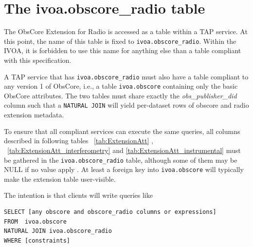 \documentclass[11pt,a4paper]{ivoa}
\begin{document}
\section{The ivoa.obscore\_radio table}
\label{sec:implementation}
The ObsCore Extension for Radio is accessed as a table within a TAP
\citep{2019ivoa.spec.0927D} service.  At this
point, the name of this table is fixed to \verb|ivoa.obscore_radio|.
Within the IVOA, it is forbidden to use this name for anything else than a table compliant
with this specification.


A TAP service that has \verb|ivoa.obscore_radio| must also have a table
compliant to any version 1 of ObsCore, i.e., a table
\verb|ivoa.obscore| containing only the basic ObsCore attributes. The two tables must share exactly the \emph{obs\_publisher\_did} column such
that a \verb|NATURAL JOIN| will yield per-dataset rows of obscore and
radio extension metadata.  

To ensure that all compliant services can execute the same queries,
all columns described in following tables ~\ref{tab:ExtensionAtt} , ~\ref{tab:ExtensionAtt_interferometry} and \ref{tab:ExtensionAtt_instrumental} must be gathered  in the \verb|ivoa.obscore_radio|
table, although some of them may be NULL if no value apply . At least a foreign key into \verb|ivoa.obscore| will typically
make the extension table user-visible. 

The intention is that clients will write queries like
\begin{lstlisting}
SELECT [any obscore and obscore_radio columns or expressions]
FROM  ivoa.obscore
NATURAL JOIN ivoa.obscore_radio
WHERE [constraints]
\end{lstlisting}


\end{document}
